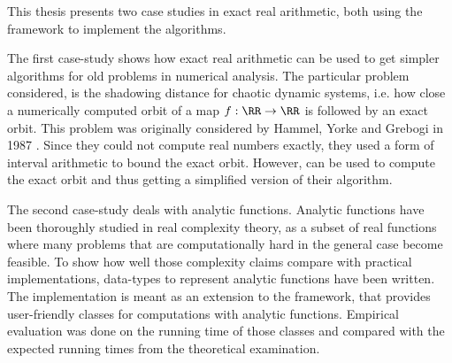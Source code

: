 This thesis presents two case studies in exact real arithmetic, both using the
\irram framework to implement the algorithms.

The first case-study shows how exact real arithmetic can be used to get simpler
algorithms for old problems in numerical analysis.
The particular problem considered, is the shadowing distance for chaotic
dynamic systems, i.e. how close a numerically computed orbit of a map $f: \RR
\to \RR$ is followed by an exact orbit.
This problem was originally considered by Hammel, Yorke and Grebogi in 1987
\cite{Hammel1987}. 
Since they could not compute real numbers exactly, they used a form of interval
arithmetic to bound the exact orbit.
However, \irram can be used to compute the exact orbit and thus getting a
simplified version of their algorithm.

The second case-study deals with analytic functions. 
Analytic functions have been thoroughly studied in real complexity theory, as a
subset of real functions where many problems that are computationally hard in
the general case become feasible. 
To show how well those complexity claims compare with practical
implementations, data-types to represent analytic functions have been written.
The implementation is meant as an extension to the \irram framework, that
provides user-friendly classes for computations with analytic functions.
Empirical evaluation was done on the running time of those classes and compared
with the expected running times from the theoretical examination.

